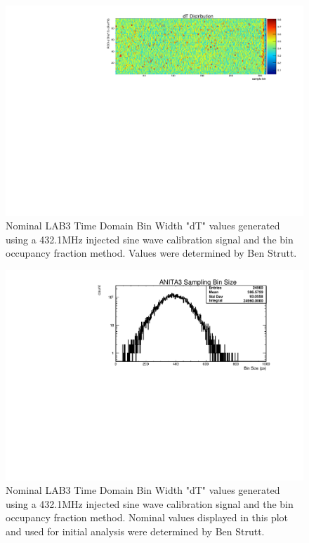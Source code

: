 	\begin{figure}
		\includegraphics[width=\textwidth]{figures/dTNominal2D}
		\caption{Nominal LAB3 Time Domain Bin Width "dT" values generated using a 432.1MHz injected sine wave calibration signal and the bin occupancy fraction method.  Values were determined by Ben Strutt\cite{BenSThesis}.}
		\label{fig:dTNominal2D}
	\end{figure}
	
	
	\begin{figure}
		\includegraphics[width=\textwidth]{figures/dTNominal}
		\caption{Nominal LAB3 Time Domain Bin Width "dT" values generated using a 432.1MHz injected sine wave calibration signal and the bin occupancy fraction method.  Nominal values displayed in this plot and used for initial analysis were determined by Ben Strutt\cite{BenSThesis}.}
		\label{fig:dTNominal}
	\end{figure}
		
